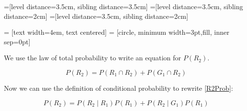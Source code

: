 \documentclass[a4paper,11pt]{article}
\begin{document}
=[level distance=3.5cm, sibling distance=3.5cm]
=[level distance=3.5cm, sibling distance=2cm]
=[level distance=3.5cm, sibling distance=2cm]


 = [text width=4em, text centered]
 = [circle, minimum width=3pt,fill, inner sep=0pt]



We use the law of total probability to write an equation for 
$P \left( R_{2} \right)$.

\begin{equation} \label{R2Prob}
  P \left( R_{2} \right) = P \left( R_{1} \cap R_{2} \right) +
    P\left( G_{1} \cap R_{2} \right)
\end{equation}

Now we can use the definition of conditional probability to rewrite
\ref{R2Prob}:

\begin{equation} \label{R2ProbApplyDef}
  P \left( R_{2} \right) = P \left( R_{2} \mid R_{1} \right) 
    P \left( R_{1} \right) +
    P\left( R_{2} \mid G_{1} \right) P \left( R_{1} \right)
\end{equation}
\end{document}
